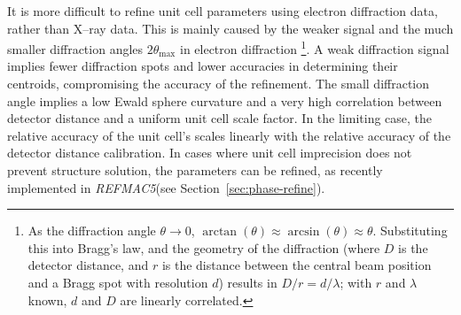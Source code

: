 \documentclass[preprint]{iucr}
\newcommand{\refmac}{\emph{REFMAC5}\xspace}
\newcounter{DWCounter}
\newcommand{\DW}[1]{%
   \stepcounter{DWCounter}%
   {\color{red}{\textbf{DW \#\arabic{DWCounter}: }#1}}%
  }
\begin{document}
It is more difficult to refine unit cell parameters using electron
diffraction data, rather than X--ray data. This is mainly caused by the weaker
signal and the much smaller diffraction angles $2\theta_\text{max}$ in electron diffraction
\footnote{As the diffraction angle $\theta \to 0$, $\arctan(\theta) \approx \arcsin(\theta)
\approx \theta$. Substituting this into Bragg's law, and the geometry of the diffraction (where
$D$ is the detector distance, and $r$ is the distance between the central beam position and a Bragg
spot with resolution $d$) results in $D/r = d/\lambda$; with $r$ and $\lambda$ known, $d$ and $D$ are
linearly correlated.}.
A weak diffraction signal implies fewer diffraction spots and lower accuracies in
determining their centroids, compromising the accuracy of the refinement. The small diffraction
angle implies a low Ewald sphere curvature and a very high correlation between detector
distance and a uniform unit cell scale factor. In the limiting case, the relative
accuracy of the unit cell’s scales linearly with the relative accuracy of the detector
distance calibration. In cases where unit cell imprecision does not prevent structure
solution, the parameters can be refined, as recently implemented in \refmac (see
Section~\ref{sec:phase-refine}).

\end{document}
